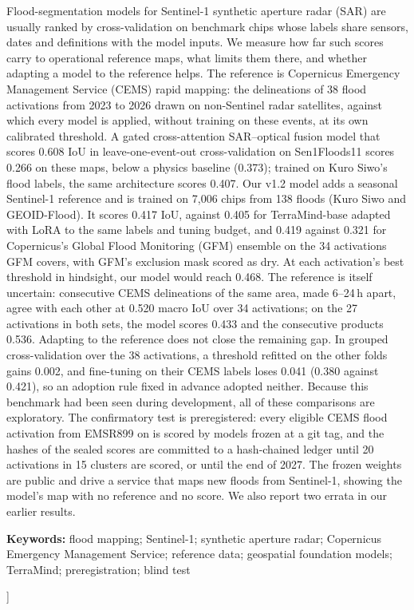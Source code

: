 \documentclass[10pt,twocolumn,a4paper]{article}
\begin{document}
{\begin{center}
\begin{minipage}{0.9\textwidth}
Flood-segmentation models for Sentinel-1 synthetic aperture radar (SAR) are usually ranked by cross-validation on
benchmark chips whose labels share sensors, dates and definitions with the model inputs. We measure how far such
scores carry to operational reference maps, what limits them there, and whether adapting a model to the reference
helps. The reference is Copernicus Emergency Management Service (CEMS) rapid mapping: the delineations of 38 flood
activations from 2023 to 2026 drawn on non-Sentinel radar satellites, against which every model is applied, without
training on these events, at its own calibrated threshold. A gated cross-attention SAR--optical fusion model that
scores 0.608 IoU in leave-one-event-out cross-validation on Sen1Floods11 scores 0.266 on these maps, below a physics
baseline (0.373); trained on Kuro Siwo's flood labels, the same architecture scores 0.407. Our v1.2 model adds a
seasonal Sentinel-1 reference and is trained on 7,006 chips from 138 floods (Kuro Siwo and GEOID-Flood). It scores
0.417 IoU, against 0.405 for TerraMind-base adapted with LoRA to the same labels and tuning budget, and 0.419
against 0.321 for Copernicus's Global Flood Monitoring (GFM) ensemble on the 34 activations GFM covers, with GFM's
exclusion mask scored as dry. At each activation's best threshold in hindsight, our model would reach 0.468. The
reference is itself uncertain: consecutive CEMS delineations of the same area, made 6--24\,h apart, agree with each
other at 0.520 macro IoU over 34 activations; on the 27 activations in both sets, the model scores 0.433 and the
consecutive products 0.536. Adapting to the reference does not close the remaining gap. In grouped cross-validation over the 38 activations, a threshold
refitted on the other folds gains 0.002, and fine-tuning on their CEMS labels loses 0.041 (0.380 against 0.421), so
an adoption rule fixed in advance adopted neither. Because this benchmark had been seen during development, all of
these comparisons are exploratory. The confirmatory test is preregistered: every eligible CEMS flood activation from
EMSR899 on is scored by models frozen at a git tag, and the hashes of the sealed scores are committed to a
hash-chained ledger until 20 activations in 15 clusters are scored, or until the end of 2027. The frozen weights are
public and drive a service that maps new floods from Sentinel-1, showing the model's map with no reference and no
score. We also report two errata in our earlier results.

\vspace{4pt}
\noindent\textbf{Keywords:} flood mapping; Sentinel-1; synthetic aperture radar; Copernicus Emergency Management
Service; reference data; geospatial foundation models; TerraMind; preregistration; blind test
\end{minipage}
\end{center}
\vspace{10pt}
}]
\end{document}
